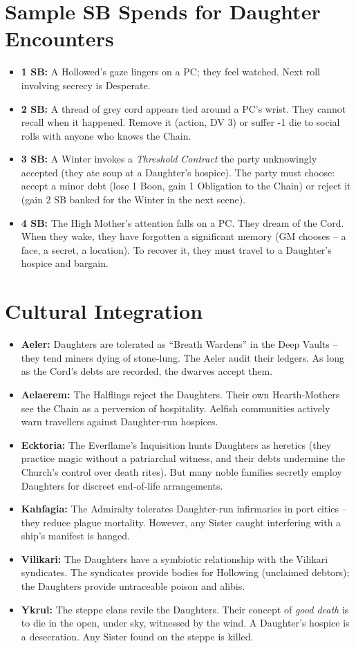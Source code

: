 \documentclass[10pt,twoside]{book}
\begin{document}
\section{Sample SB Spends for Daughter Encounters}
\begin{itemize}
\item \textbf{1 SB:} A Hollowed's gaze lingers on a PC; they feel watched. Next roll involving secrecy is Desperate.
\item \textbf{2 SB:} A thread of grey cord appears tied around a PC's wrist. They cannot recall when it happened. Remove it (action, DV 3) or suffer -1 die to social rolls with anyone who knows the Chain.
\item \textbf{3 SB:} A Winter invokes a \textit{Threshold Contract} the party unknowingly accepted (they ate soup at a Daughter's hospice). The party must choose: accept a minor debt (lose 1 Boon, gain 1 Obligation to the Chain) or reject it (gain 2 SB banked for the Winter in the next scene).
\item \textbf{4 SB:} The High Mother's attention falls on a PC. They dream of the Cord. When they wake, they have forgotten a significant memory (GM chooses – a face, a secret, a location). To recover it, they must travel to a Daughter's hospice and bargain.
\end{itemize}

\section{Cultural Integration}
\begin{itemize}
\item \textbf{Aeler:} Daughters are tolerated as “Breath Wardens” in the Deep Vaults – they tend miners dying of stone‑lung. The Aeler audit their ledgers. As long as the Cord's debts are recorded, the dwarves accept them.
\item \textbf{Aelaerem:} The Halflings reject the Daughters. Their own Hearth‑Mothers see the Chain as a perversion of hospitality. Aelfish communities actively warn travellers against Daughter‑run hospices.
\item \textbf{Ecktoria:} The Everflame's Inquisition hunts Daughters as heretics (they practice magic without a patriarchal witness, and their debts undermine the Church's control over death rites). But many noble families secretly employ Daughters for discreet end‑of‑life arrangements.
\item \textbf{Kahfagia:} The Admiralty tolerates Daughter‑run infirmaries in port cities – they reduce plague mortality. However, any Sister caught interfering with a ship's manifest is hanged.
\item \textbf{Vilikari:} The Daughters have a symbiotic relationship with the Vilikari syndicates. The syndicates provide bodies for Hollowing (unclaimed debtors); the Daughters provide untraceable poison and alibis.
\item \textbf{Ykrul:} The steppe clans revile the Daughters. Their concept of \textit{good death} is to die in the open, under sky, witnessed by the wind. A Daughter's hospice is a desecration. Any Sister found on the steppe is killed.
\end{itemize}
\end{document}
